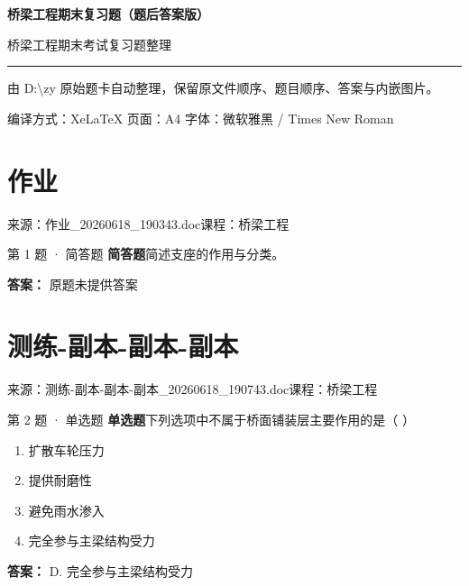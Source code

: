\documentclass[UTF8,zihao=-4,openany]{ctexbook}
\newenvironment{choices}{\begin{enumerate}[label=\Alph*.,leftmargin=9mm,labelsep=3mm,itemsep=2pt,topsep=4pt]}{\end{enumerate}}
\newcommand{\qtype}[1]{\textcolor{brand}{\sffamily\bfseries #1}}
\newcommand{\sourcefile}[1]{\textcolor{muted}{\small\sffamily 来源：#1}}
\begin{document}
\frontmatter
\begin{titlepage}
\pagecolor{paper}
\vspace*{22mm}
{\sffamily\bfseries\fontsize{30}{36}\selectfont\color{branddark} 桥梁工程期末复习题（题后答案版）\par}
\vspace{5mm}
{\Large\color{ink} 桥梁工程期末考试复习题整理\par}
\vspace{10mm}
{\color{brand}\rule{0.62\linewidth}{1.2pt}\par}
\vspace{9mm}
{\large\color{muted} 由 D:\textbackslash zy 原始题卡自动整理，保留原文件顺序、题目顺序、答案与内嵌图片。\par}
\vfill
{\sffamily\color{muted} 编译方式：XeLaTeX \quad 页面：A4 \quad 字体：微软雅黑 / Times New Roman\par}
\end{titlepage}
\nopagecolor
\tableofcontents
\mainmatter


\chapter{作业}

\sourcefile{作业\_20260618\_190343.doc}\quad \textcolor{muted}{\small\sffamily 课程：桥梁工程}

\begin{questionbox}{第 1 题 · 简答题}
\qtype{简答题}\quad 简述支座的作用与分类。
\begin{answerbox}
\textbf{答案：} 原题未提供答案
\end{answerbox}
\end{questionbox}

\chapter{测练-副本-副本-副本}

\sourcefile{测练-副本-副本-副本\_20260618\_190743.doc}\quad \textcolor{muted}{\small\sffamily 课程：桥梁工程}

\begin{questionbox}{第 2 题 · 单选题}
\qtype{单选题}\quad 下列选项中不属于桥面铺装层主要作用的是（ ）
\begin{choices}
\item 扩散车轮压力
\item 提供耐磨性
\item 避免雨水渗入
\item 完全参与主梁结构受力
\end{choices}
\begin{answerbox}
\textbf{答案：} D. 完全参与主梁结构受力
\end{answerbox}
\end{questionbox}
\end{document}
